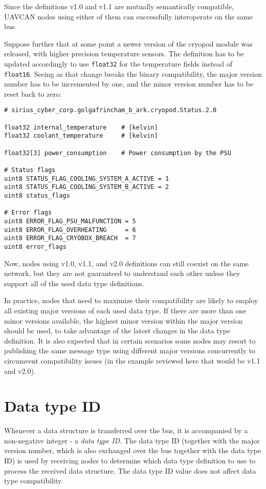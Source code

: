Since the definitions v1.0 and v1.1 are mutually semantically compatible,
UAVCAN nodes using either of them can successfully interoperate on the same bus.

Suppose further that at some point a newer version of the cryopod module was released,
with higher precision temperature sensors.
The definition has to be updated accordingly to use \verb|float32| for the temperature fields
instead of \verb|float16|.
Seeing as that change breaks the binary compatibility,
the major version number has to be incremented by one, and the minor version number has to be reset back to zero:

\begin{verbatim}
# sirius_cyber_corp.golgafrincham_b_ark.cryopod.Status.2.0

float32 internal_temperature    # [kelvin]
float32 coolant_temperature     # [kelvin]

float32[3] power_consumption    # Power consumption by the PSU

# Status flags
uint8 STATUS_FLAG_COOLING_SYSTEM_A_ACTIVE = 1
uint8 STATUS_FLAG_COOLING_SYSTEM_B_ACTIVE = 2
uint8 status_flags

# Error flags
uint8 ERROR_FLAG_PSU_MALFUNCTION = 5
uint8 ERROR_FLAG_OVERHEATING     = 6
uint8 ERROR_FLAG_CRYOBOX_BREACH  = 7
uint8 error_flags
\end{verbatim}

Now, nodes using v1.0, v1.1, and v2.0 definitions can still coexist on the same network,
but they are not guaranteed to understand each other unless they support all of the used data type definitions.

In practice, nodes that need to maximize their compatibility are likely to employ all existing major versions of
each used data type.
If there are more than one minor versions available, the highest minor version within the major version should
be used, to take advantage of the latest changes in the data type definition.
It is also expected that in certain scenarios some nodes may resort to publishing the same message type
using different major versions concurrently to circumvent compatibility issues (in the
example reviewed here that would be v1.1 and v2.0).

\section{Data type ID}

Whenever a data structure is transferred over the bus, it is accompanied by a non-negative integer
- a \emph{data type ID}.
The data type ID (together with the major version number, which is also exchanged over the bus together with the
data type ID) is used by receiving nodes to determine which data type definition to use
to process the received data structure.
The data type ID value does not affect data type compatibility.

